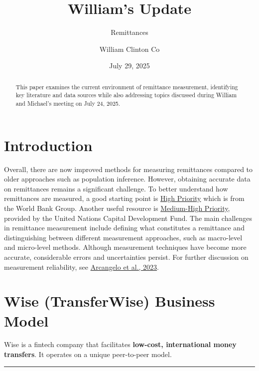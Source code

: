\documentclass[
  11pt,
]{article}
\title{William's Update}
\subtitle{Remittances}
\author{William Clinton Co}
\date{July 29, 2025}
\renewcommand*\contentsname{Table of contents}
\newcommand\contentsname{Table of contents}
\begin{document}
\maketitle
\begin{abstract}
This paper examines the current environment of remittance measurement,
identifying key literature and data sources while also addressing topics
discussed during William and Michael's meeting on July 24, 2025.
\end{abstract}

\renewcommand*\contentsname{Table of contents}
{
\hypersetup{linkcolor=}
\setcounter{tocdepth}{3}
\tableofcontents
}

\section{Introduction}\label{introduction}

Overall, there are now improved methods for measuring remittances
compared to older approaches such as population inference. However,
obtaining accurate data on remittances remains a significant challenge.
To better understand how remittances are measured, a good starting point
is \hyperref[high-priority]{High Priority} which is from the World Bank
Group. Another useful resource is
\hyperref[medium-high-priority]{Medium-High Priority}, provided by the
United Nations Capital Development Fund. The main challenges in
remittance measurement include defining what constitutes a remittance
and distinguishing between different measurement approaches, such as
macro-level and micro-level methods. Although measurement techniques
have become more accurate, considerable errors and uncertainties
persist. For further discussion on measurement reliability, see
\href{https://drive.google.com/file/d/1pAtaJZZPiYqQxYHhQaiGtDIG2D1GC0vw/view?usp=sharing}{Arcangelo
et al., 2023}.

\section{Wise (TransferWise) Business
Model}\label{wise-transferwise-business-model}

Wise is a fintech company that facilitates \textbf{low-cost,
international money transfers}. It operates on a unique peer-to-peer
model.

\begin{center}\rule{0.5\linewidth}{0.5pt}\end{center}
\end{document}
